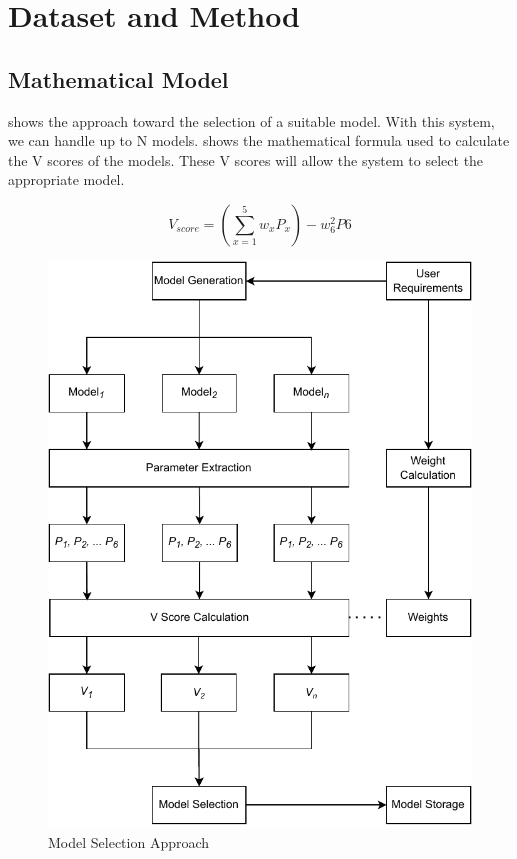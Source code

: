 \section{Dataset and Method} \label{sec:dataset_and_method}

\subsection{Mathematical Model}\label{subsec:mathematical_model}

 shows the approach toward the selection of a suitable model. With this system, we can handle up to N models.  shows the mathematical formula used to calculate the V scores of the models. These V scores will allow the system to select the appropriate model.

\begin{equation}\label{eq:v_score}
    V_{score} = \left(\sum_{x=1}^{5} w_xP_x\right) - w_6^2P6
\end{equation}

\begin{figure}
    \centering
    \includegraphics[width=1.4\columnwidth]{media/ch_dataset_and_methods/math_model_relaxed.pdf}
    \caption{Model Selection Approach}
    \label{fig:model_selection_approach}
\end{figure}

